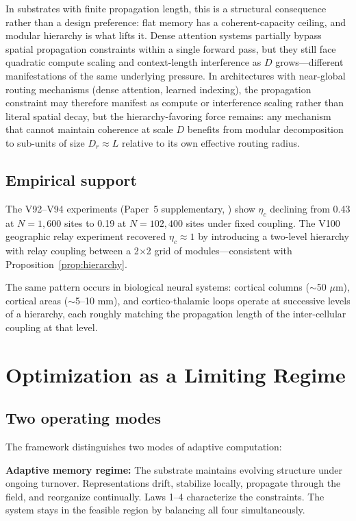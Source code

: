 \documentclass[12pt]{article}
\begin{document}
In substrates with finite propagation length, this is a structural consequence rather than a design preference: flat memory has a coherent-capacity ceiling, and modular hierarchy is what lifts it. Dense attention systems partially bypass spatial propagation constraints within a single forward pass, but they still face quadratic compute scaling and context-length interference as $D$ grows---different manifestations of the same underlying pressure. In architectures with near-global routing mechanisms (dense attention, learned indexing), the propagation constraint may therefore manifest as compute or interference scaling rather than literal spatial decay, but the hierarchy-favoring force remains: any mechanism that cannot maintain coherence at scale $D$ benefits from modular decomposition to sub-units of size $D_r \approx L$ relative to its own effective routing radius.

\subsection{Empirical support}

The V92--V94 experiments (Paper~5 supplementary, \cite{aubin2026unified}) show $\eta_c$ declining from 0.43 at $N=1{,}600$ sites to 0.19 at $N=102{,}400$ sites under fixed coupling. The V100 geographic relay experiment recovered $\eta_c \approx 1$ by introducing a two-level hierarchy with relay coupling between a 2$\times$2 grid of modules---consistent with Proposition~\ref{prop:hierarchy}.

The same pattern occurs in biological neural systems: cortical columns ($\sim$50 $\mu$m), cortical areas ($\sim$5--10 mm), and cortico-thalamic loops operate at successive levels of a hierarchy, each roughly matching the propagation length of the inter-cellular coupling at that level.

\section{Optimization as a Limiting Regime}
\label{sec:optimization}

\subsection{Two operating modes}

The framework distinguishes two modes of adaptive computation:

\textbf{Adaptive memory regime:} The substrate maintains evolving structure under ongoing turnover. Representations drift, stabilize locally, propagate through the field, and reorganize continually. Laws 1--4 characterize the constraints. The system stays in the feasible region by balancing all four simultaneously.
\end{document}
